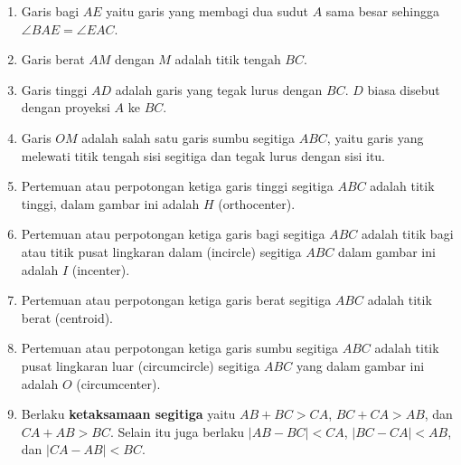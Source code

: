 \begin{enumerate}
    \item Garis bagi $AE$ yaitu garis yang membagi dua sudut $A$ sama besar sehingga $\angle BAE = \angle EAC$. 
    \item Garis berat $AM$ dengan $M$ adalah titik tengah $BC$.
    \item Garis tinggi $AD$ adalah garis yang tegak lurus dengan $BC$. $D$ biasa disebut dengan proyeksi $A$ ke $BC$.
    \item Garis $OM$ adalah salah satu garis sumbu segitiga $ABC$, yaitu garis yang melewati titik tengah sisi segitiga dan tegak lurus dengan sisi itu.
    \item Pertemuan atau perpotongan ketiga garis tinggi segitiga $ABC$ adalah titik tinggi, dalam gambar ini adalah $H$ (orthocenter).
    \item Pertemuan atau perpotongan ketiga garis bagi segitiga $ABC$ adalah titik bagi atau titik pusat lingkaran dalam (incircle) segitiga $ABC$ dalam gambar ini adalah $I$ (incenter).
    \item Pertemuan atau perpotongan ketiga garis berat segitiga $ABC$ adalah titik berat (centroid).
    \item Pertemuan atau perpotongan ketiga garis sumbu segitiga $ABC$ adalah titik pusat lingkaran luar (circumcircle) segitiga $ABC$ yang dalam gambar ini adalah $O$ (circumcenter).
    \item Berlaku \textbf{ketaksamaan segitiga} yaitu $AB+BC>CA$, $BC+CA>AB$, dan $CA+AB>BC$. Selain itu juga berlaku $|AB-BC|<CA$, $|BC-CA|<AB$, dan $|CA-AB|<BC$.
\end{enumerate}


